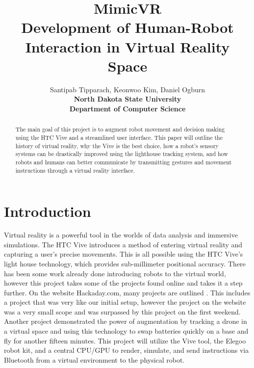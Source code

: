 \documentclass[10pt,a4paper]{article}
\title{\textbf{\Huge MimicVR \\
	\Large  Development of Human-Robot Interaction in Virtual Reality Space}}
\author{Santipab Tipparach, Keonwoo Kim, Daniel Ogburn\\
	\textbf{North Dakota State University}\\\textbf{Department of Computer Science}}
\begin{document}
\maketitle


\begin{abstract}

	The main goal of this project is to augment robot movement and decision making using the HTC Vive and a streamlined user interface. This paper will outline the history of virtual reality, why the Vive is the best choice, how a robot's sensory systems can be drastically improved using the lighthouse tracking system, and how robots and humans can better communicate by transmitting gestures and movement instructions through a virtual reality interface.

\end{abstract}

	\section*{Introduction}
	Virtual reality is a powerful tool in the worlds of data analysis and immersive simulations. The HTC Vive introduces a method of entering virtual reality and capturing a user's precise movements. This is all possible using the HTC Vive's light house technology, which provides sub-millimeter positional accuracy. There has been some work already done introducing robots to the virtual world, however this project takes some of the projects found online and takes it a step further. On the website Hackaday.com, many projects are outlined \cite{hack1}. This includes a project that was very like our initial setup, however the project on the website was a very small scope and was surpassed by this project on the first weekend. Another project demonstrated the power of augmentation by tracking a drone in a virtual space and using this technology to swap batteries quickly on a base and fly for another fifteen minutes. This project will utilize the Vive tool, the Elegoo robot kit, and a central CPU/GPU to render, simulate, and send instructions via Bluetooth from a virtual environment to the physical robot.
\end{document}
